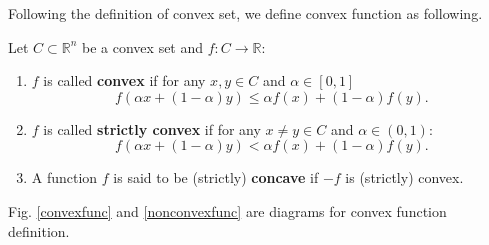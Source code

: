 Following the definition of convex set, we define convex function as following.
\begin{definition}
	Let $C \subset \mathbb{R}^n$ be a convex set and $f: C \rightarrow \mathbb{R}$:
	\begin{enumerate}
		\item $f$ is called {\bf convex} if for any $x, y \in C$ and $\alpha\in [0, 1]$
		\begin{equation}
		f(\alpha x + (1- \alpha)y) \leq \alpha f(x )+ (1- \alpha)f(y).	
		\end{equation}
		\item $f$ is called {\bf strictly convex} if for any $x\neq y \in C$ and $\alpha\in (0, 1)$:
		\begin{equation}
		f(\alpha x + (1- \alpha)y) < \alpha f(x ) + (1 - \alpha)f(y).
		\end{equation}
		\item A function $f$ is said to be (strictly) {\bf concave} if $-f$ is (strictly) convex.
	\end{enumerate}
\end{definition}
Fig. \ref{convexfunc} and \ref{nonconvexfunc} are diagrams  for convex function definition.
